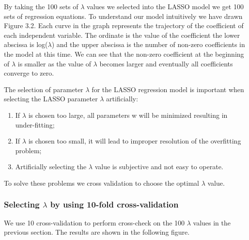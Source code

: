 \documentclass{mcmthesis}
\begin{document}
  
By taking the 100 sets of $\lambda$ values we selected into the LASSO model we get 100 sets of regression equations.  To understand our model intuitively we have drawn Figure 3.2. Each curve in the graph represents the trajectory of the coefficient of each independent variable. The ordinate is the value of the coefficient the lower abscissa is log($\lambda$) and the upper abscissa is the number of non-zero coefficients in the model at this time. We can see that the non-zero coefficient at the beginning of $\lambda$ is smaller as the value of $\lambda$ becomes larger and eventually all coefficients converge to zero.

The selection of parameter $\lambda$ for the LASSO regression model is important when selecting the LASSO parameter $\lambda$ artificially:

\begin{enumerate}
  \item If $\lambda$ is chosen too large, all parameters w will be minimized resulting in under-fitting;
  \item If $\lambda$ is chosen too small, it will lead to improper resolution of the overfitting problem;
  \item Artificially selecting the $\lambda$ value is subjective and not easy to operate.
\end{enumerate}

To solve these problems we cross validation to choose the optimal $\lambda$ value.

\subsubsection{Selecting $\lambda$ by using 10-fold cross-validation} 
We use 10 cross-validation to perform cross-check on the 100 $\lambda$ values in the previous section. The results are shown in the following figure.
\end{document}
